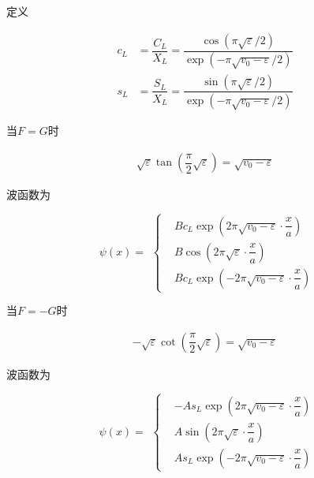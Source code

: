 \documentclass{article}
\begin{document}
定义

\begin{equation*}
  \begin{aligned}
    c_L &= \dfrac{C_L}{X_L} = \dfrac{\cos \left( \pi \sqrt{\varepsilon} / 2 \right)}{\exp \left( - \pi \sqrt{v_0 - \varepsilon} / 2 \right)} \\
    s_L &= \dfrac{S_L}{X_L} = \dfrac{\sin \left( \pi \sqrt{\varepsilon} / 2 \right)}{\exp \left(  - \pi \sqrt{v_0 - \varepsilon}/2 \right)}  
  \end{aligned}
\end{equation*}

当$F=G$时

\begin{equation*}
  \begin{aligned}
    \sqrt{\varepsilon} \tan \left( \dfrac{\pi}{2} \sqrt{\varepsilon}  \right) = \sqrt{v_0 - \varepsilon}
  \end{aligned}
\end{equation*}

波函数为

\begin{equation*}
  \begin{aligned}
    \psi \left( x \right) = 
  \end{aligned}
  \left\{
  \begin{aligned}
    & B c_L \exp \left(2 \pi \sqrt{v_0 - \varepsilon} \cdot \dfrac{x}{a}  \right) \\
    & B \cos \left( 2 \pi \sqrt{\varepsilon} \cdot \dfrac{x}{a}  \right) \\
    & B c_L \exp \left( - 2 \pi \sqrt{v_0 - \varepsilon} \cdot \dfrac{x}{a}  \right)
  \end{aligned}
  \right.
\end{equation*}

当$F=-G$时

\begin{equation*}
  \begin{aligned}
    - \sqrt{\varepsilon} \cot \left( \dfrac{\pi}{2} \sqrt{\varepsilon}  \right) = \sqrt{v_0 - \varepsilon}
  \end{aligned}
\end{equation*}

波函数为

\begin{equation*}
  \begin{aligned}
    \psi \left( x \right) = 
  \end{aligned}
  \left\{
  \begin{aligned}
    & - A s_L \exp \left(2 \pi \sqrt{v_0 - \varepsilon} \cdot \dfrac{x}{a}  \right) \\
    & A \sin \left( 2 \pi \sqrt{\varepsilon} \cdot \dfrac{x}{a}  \right) \\
    & A s_L \exp \left( - 2 \pi \sqrt{v_0 - \varepsilon} \cdot \dfrac{x}{a}  \right)
  \end{aligned}
  \right.
\end{equation*}
\end{document}
